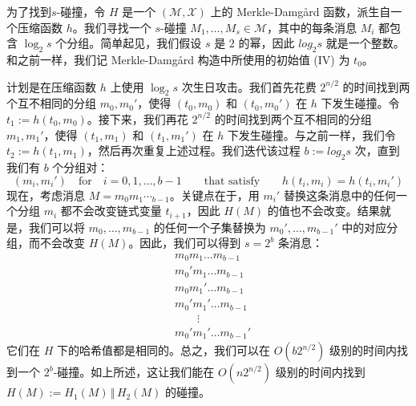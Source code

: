 \begin{snote}[寻找$s$-碰撞。]
为了找到$s$-碰撞，令 $H$ 是一个 $(\mathcal{M},\mathcal{X})$ 上的 Merkle-Damg{\aa}rd 函数，派生自一个压缩函数 $h$。我们寻找一个 $s$-碰撞 $M_1,\dots,M_s\in\mathcal{M}$，其中的每条消息 $M_i$ 都包含 $\log_2s$ 个分组。简单起见，我们假设 $s$ 是 $2$ 的幂，因此 $log_2s$ 就是一个整数。和之前一样，我们记 Merkle-Damg{\aa}rd 构造中所使用的初始值 (IV) 为 $t_0$。

计划是在压缩函数 $h$ 上使用 $\log_2s$ 次生日攻击。我们首先花费 $2^{n/2}$ 的时间找到两个互不相同的分组 $m_0,m_0'$，使得 $(t_0,m_0)$ 和 $(t_0,m_0')$ 在 $h$ 下发生碰撞。令 $t_1:=h(t_0,m_0)$。接下来，我们再花 $2^{n/2}$ 的时间找到两个互不相同的分组 $m_1,m_1'$，使得 $(t_1,m_1)$ 和 $(t_1,m_1')$ 在 $h$ 下发生碰撞。与之前一样，我们令 $t_2:=h(t_1,m_1)$，然后再次重复上述过程。我们迭代该过程 $b:=log_2s$ 次，直到我们有 $b$ 个分组对：
\[
(m_i,m_i')
\quad\text{for}\quad
i=0,1,\dots,b-1
\quad\quad\text{that satisfy}\quad\quad
h(t_i,m_i)=h(t_i,m_i')
\]
现在，考虑消息 $M=m_0m_1\dotsm_{b-1}$。关键点在于，用 $m_i'$ 替换这条消息中的任何一个分组 $m_i$ 都不会改变链式变量 $t_{i+1}$，因此 $H(M)$ 的值也不会改变。结果就是，我们可以将 $m_0,\dots,m_{b-1}$ 的任何一个子集替换为 $m_0',\dots,m_{b-1}'$ 中的对应分组，而不会改变 $H(M)$。因此，我们可以得到 $s=2^b$ 条消息：
\[
\begin{aligned}
& m_0m_1\dots m_{b-1}\\
& m_0'm_1\dots m_{b-1}\\
& m_0m_1'\dots m_{b-1}\\
& m_0'm_1'\dots m_{b-1}\\
& \quad\quad\vdots\\
& m_0'm_1'\dots m_{b-1}'
\end{aligned}
\]
它们在 $H$ 下的哈希值都是相同的。总之，我们可以在 $O(b2^{n/2})$ 级别的时间内找到一个 $2^b$-碰撞。如上所述，这让我们能在 $O(n2^{n/2})$ 级别的时间内找到 $H(M):=H_1(M)\,\Vert\,H_2(M)$ 的碰撞。
\end{snote}